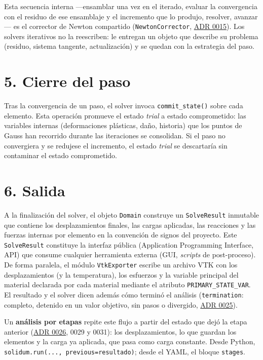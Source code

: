 \documentclass[11pt,oneside]{report}
\begin{document}
Esta secuencia interna ---ensamblar una vez en el iterado, evaluar la convergencia con el residuo de ese ensamblaje y el incremento que lo produjo, resolver, avanzar--- es el corrector de Newton compartido (\texttt{NewtonCorrector}, \hyperref[adr:0015]{ADR 0015}). Los solvers iterativos no la reescriben: le entregan un objeto que describe su problema (residuo, sistema tangente, actualización) y se quedan con la estrategia del paso.

\section*{5. Cierre del paso}

Tras la convergencia de un paso, el solver invoca \texttt{commit\_state()} sobre cada elemento. Esta operación promueve el estado \textit{trial} a estado comprometido: las variables internas (deformaciones plásticas, daño, historia) que los puntos de Gauss han recorrido durante las iteraciones se consolidan. Si el paso no convergiera y se redujese el incremento, el estado \textit{trial} se descartaría sin contaminar el estado comprometido.

\section*{6. Salida}

A la finalización del solver, el objeto \texttt{Domain} construye un \texttt{SolveResult} inmutable que contiene los desplazamientos finales, las cargas aplicadas, las reacciones y las fuerzas internas por elemento en la convención de signos del proyecto. Este \texttt{SolveResult} constituye la interfaz pública (Application Programming Interface, API) que consume cualquier herramienta externa (GUI, \textit{scripts} de post-proceso). De forma paralela, el módulo \texttt{VtkExporter} escribe un archivo VTK con los desplazamientos (y la temperatura), los esfuerzos y la variable principal del material declarada por cada material mediante el atributo \texttt{PRIMARY\_\allowbreak{}STATE\_\allowbreak{}VAR}. El resultado y el solver dicen además cómo terminó el análisis (\texttt{termination}: completo, detenido en un valor objetivo, sin pasos o divergido, \hyperref[adr:0025]{ADR 0025}).

Un \textbf{análisis por etapas} repite este flujo a partir del estado que dejó la etapa anterior (\hyperref[adr:0026]{ADR 0026}, 0029 y 0031): los desplazamientos, lo que guardan los elementos y la carga ya aplicada, que pasa como carga constante. Desde Python, \texttt{solidum.\allowbreak{}run(.\allowbreak{}.\allowbreak{}.\allowbreak{}, previous=resultado)}; desde el YAML, el bloque \texttt{stages}.
\end{document}
